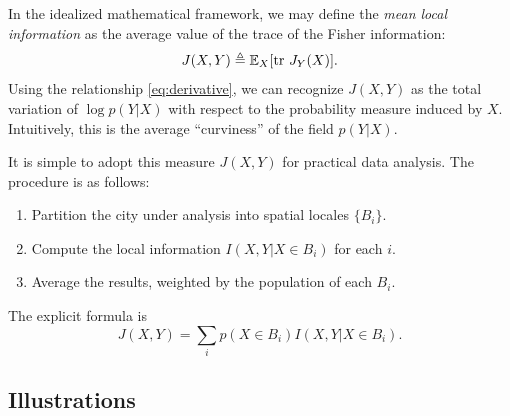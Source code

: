 \documentclass[english]{scrartcl}
\begin{document}
		In the idealized mathematical framework, we may define the \emph{mean local information} as the average value of the trace of the Fisher information: 
		\begin{equation}
			J(X,Y) \triangleq \mathbb{E}_X[\text{tr } J_Y(X)].
		\end{equation}
		Using the relationship \eqref{eq:derivative}, we can recognize $J(X,Y)$ as the total variation of $\log p(Y|X)$ with respect to the probability measure induced by $X$. Intuitively, this is the average ``curviness'' of the field $p(Y|X)$. 

		It is simple to adopt this measure $J(X,Y)$ for practical data analysis. The procedure is as follows: 
		\begin{enumerate}
		 	\item Partition the city under analysis into spatial locales $\{B_i\}$.
		 	\item Compute the local information $I(X,Y|X \in B_i)$ for each $i$. 
		 	\item Average the results, weighted by the population of each $B_i$. 
		\end{enumerate} 
		The explicit formula is 
		\begin{equation}
			J(X,Y) = \sum_i p(X \in B_i) I(X,Y|X \in B_i). \label{eq:formula}
		\end{equation}

	\subsection{Illustrations}
\end{document}
